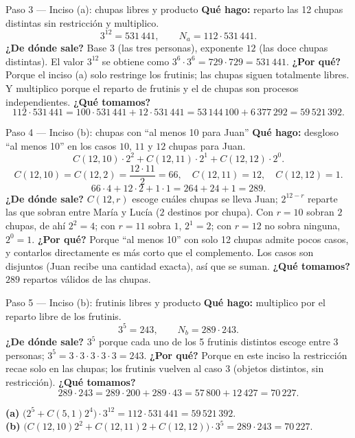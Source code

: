 \documentclass[11pt]{article}
\begin{document}
\begin{paso}{Paso 3 --- Inciso (a): chupas libres y producto}
\textbf{Qué hago:} reparto las 12 chupas distintas sin restricción y multiplico.
\[
3^{12}=531\,441,\qquad N_a=112\cdot 531\,441 .
\]
\textbf{¿De dónde sale?} Base $3$ (las tres personas), exponente $12$ (las doce chupas distintas). El valor $3^{12}$ se obtiene como $3^6\cdot 3^6=729\cdot 729=531\,441$.
\textbf{¿Por qué?} Porque el inciso (a) solo restringe los frutinis; las chupas siguen totalmente libres. Y multiplico porque el reparto de frutinis y el de chupas son procesos independientes.
\textbf{¿Qué tomamos?}
\[
112\cdot 531\,441=100\cdot531\,441+12\cdot531\,441=53\,144\,100+6\,377\,292=59\,521\,392 .
\]
\end{paso}

\begin{paso}{Paso 4 --- Inciso (b): chupas con ``al menos 10 para Juan''}
\textbf{Qué hago:} desgloso ``al menos 10'' en los casos $10$, $11$ y $12$ chupas para Juan.
\[
C(12,10)\cdot 2^2+C(12,11)\cdot 2^1+C(12,12)\cdot 2^0 .
\]
\[
C(12,10)=C(12,2)=\frac{12\cdot 11}{2}=66,\quad C(12,11)=12,\quad C(12,12)=1 .
\]
\[
66\cdot 4+12\cdot 2+1\cdot 1=264+24+1=289 .
\]
\textbf{¿De dónde sale?} $C(12,r)$ escoge cuáles chupas se lleva Juan; $2^{12-r}$ reparte las que sobran entre María y Lucía ($2$ destinos por chupa). Con $r=10$ sobran $2$ chupas, de ahí $2^2=4$; con $r=11$ sobra $1$, $2^1=2$; con $r=12$ no sobra ninguna, $2^0=1$.
\textbf{¿Por qué?} Porque ``al menos 10'' con solo 12 chupas admite pocos casos, y contarlos directamente es más corto que el complemento. Los casos son disjuntos (Juan recibe una cantidad exacta), así que se suman.
\textbf{¿Qué tomamos?} $289$ repartos válidos de las chupas.
\end{paso}

\begin{paso}{Paso 5 --- Inciso (b): frutinis libres y producto}
\textbf{Qué hago:} multiplico por el reparto libre de los frutinis.
\[
3^5=243,\qquad N_b=289\cdot 243 .
\]
\textbf{¿De dónde sale?} $3^5$ porque cada uno de los 5 frutinis distintos escoge entre 3 personas; $3^5=3\cdot3\cdot3\cdot3\cdot3=243$.
\textbf{¿Por qué?} Porque en este inciso la restricción recae solo en las chupas; los frutinis vuelven al caso 3 (objetos distintos, sin restricción).
\textbf{¿Qué tomamos?}
\[
289\cdot 243=289\cdot 200+289\cdot 43=57\,800+12\,427=70\,227 .
\]
\end{paso}

\begin{resp}
\textbf{(a)} $\bigl(2^5+C(5,1)2^4\bigr)\cdot 3^{12}=112\cdot 531\,441=59\,521\,392$.\\
\textbf{(b)} $\bigl(C(12,10)2^2+C(12,11)2+C(12,12)\bigr)\cdot 3^5=289\cdot 243=70\,227$.
\end{resp}
\end{document}
